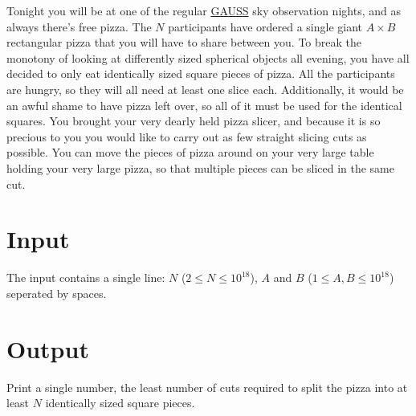 \noindent
Tonight you will be at one of the regular \href{https://au.se/gauss/}{GAUSS} sky observation
nights, and as always there's free pizza.  The $N$ participants have ordered a single giant $A\times
B$ rectangular pizza that you will have to share between you. To break the monotony of looking at
differently sized spherical objects all evening, you have all decided to only eat identically sized
square pieces of pizza. All the participants are hungry, so they will all need at least one slice
each. Additionally, it would be an awful shame to have pizza left over, so all of it must be used
for the identical squares. You brought your very dearly held pizza slicer, and because it is so
precious to you you would like to carry out as few straight slicing cuts as possible. You can move
the pieces of pizza around on your very large table holding your very large pizza, so that multiple
pieces can be sliced in the same cut.

\section*{Input}

The input contains a single line: $N$ ($2 \le N \le 10^{18}$), $A$ and $B$ ($1 \le A, B \le 10^{18}$)
seperated by spaces.

\section*{Output}

Print a single number, the least number of cuts required to split the pizza into at least $N$
identically sized square pieces.
